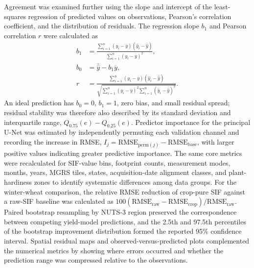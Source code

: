 Agreement was examined further using the slope and intercept of the least-squares regression of predicted values on observations, Pearson's correlation coefficient, and the distribution of residuals. The regression slope $b_1$ and Pearson correlation $r$ were calculated as
\begin{equation}
\begin{aligned}
    b_1 &=
    \frac{\sum_{i=1}^{n}(y_i-\overline{y})(\widehat{y}_i-\overline{\widehat{y}})}
    {\sum_{i=1}^{n}(y_i-\overline{y})^2}, \\
    b_0 &= \overline{\widehat{y}}-b_1\overline{y}, \\
    r &=
    \frac{\sum_{i=1}^{n}(y_i-\overline{y})(\widehat{y}_i-\overline{\widehat{y}})}
    {\sqrt{\sum_{i=1}^{n}(y_i-\overline{y})^2
    \sum_{i=1}^{n}(\widehat{y}_i-\overline{\widehat{y}})^2}}.
\end{aligned}
\label{eq:agreement_metrics}
\end{equation}
An ideal prediction has $b_0=0$, $b_1=1$, zero bias, and small residual spread; residual stability was therefore also described by its standard deviation and interquartile range, $Q_{0.75}(e)-Q_{0.25}(e)$. Predictor importance for the principal U-Net was estimated by independently permuting each validation channel and recording the increase in RMSE, $I_j=\mathrm{RMSE}_{\mathrm{perm}(j)}-\mathrm{RMSE}_{\mathrm{base}}$, with larger positive values indicating greater predictive importance. The same core metrics were recalculated for SIF-value bins, footprint counts, measurement modes, months, years, MGRS tiles, states, acquisition-date alignment classes, and plant-hardiness zones to identify systematic differences among data groups. For the winter-wheat comparison, the relative RMSE reduction of crop-pure SIF against a raw-SIF baseline was calculated as $100(\mathrm{RMSE}_{\mathrm{raw}}-\mathrm{RMSE}_{\mathrm{crop}})/\mathrm{RMSE}_{\mathrm{raw}}$. Paired bootstrap resampling by NUTS-3 region preserved the correspondence between competing yield-model predictions, and the 2.5th and 97.5th percentiles of the bootstrap improvement distribution formed the reported 95\% confidence interval. Spatial residual maps and observed-versus-predicted plots complemented the numerical metrics by showing where errors occurred and whether the prediction range was compressed relative to the observations.

